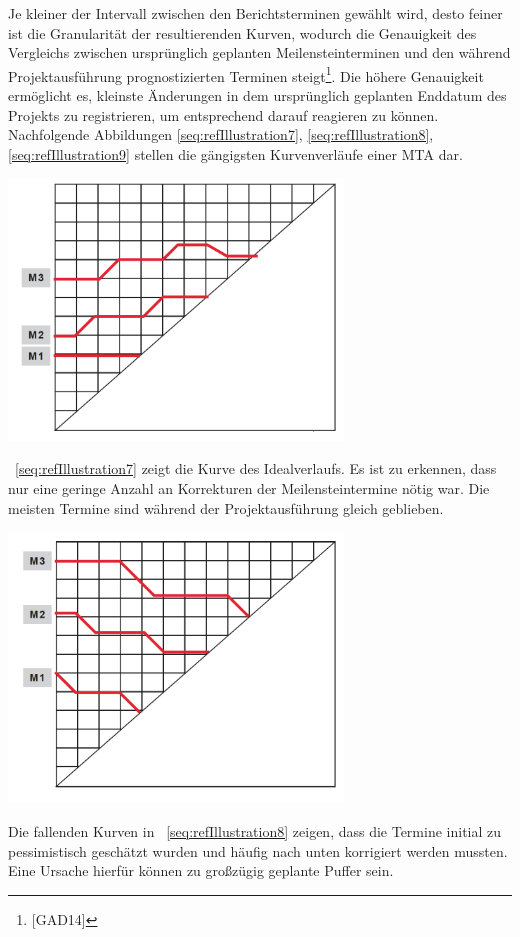 \documentclass[a4paper]{article}
\makeatletter
\newcommand\captionof[1]{\def\@captype{#1}\caption}
\makeatother
\begin{document}
\bigskip

{\sffamily
Je kleiner der Intervall zwischen den Berichtsterminen gewählt wird, desto feiner ist die Granularität der
resultierenden Kurven, wodurch die Genauigkeit des Vergleichs zwischen ursprünglich geplanten Meilensteinterminen und
den während Projektausführung prognostizierten Terminen steigt\footnote{[GAD14]}. Die höhere Genauigkeit ermöglicht es,
kleinste Änderungen in dem ursprünglich geplanten Enddatum des Projekts zu registrieren, um entsprechend darauf
reagieren zu können. Nachfolgende Abbildungen \ref{seq:refIllustration7}, \ref{seq:refIllustration8},
\ref{seq:refIllustration9} stellen die gängigsten Kurvenverläufe einer MTA dar.}


\bigskip

{\centering \includegraphics[width=8.881cm,height=6.944cm]{INMAusarbeitung02-img008.png}
\captionof{figure}[Idealverlauf der MTA{}-Kurven]{Idealverlauf der MTA-Kurven}
\label{seq:refIllustration7}
\par}
{\sffamily
\figurename~\ref{seq:refIllustration7} zeigt die Kurve des Idealverlaufs. Es ist zu erkennen, dass nur eine geringe
Anzahl an Korrekturen der Meilensteintermine nötig war. Die meisten Termine sind während der Projektausführung gleich
geblieben.}

{\centering \includegraphics[width=8.902cm,height=7.177cm]{INMAusarbeitung02-img009.png}
\captionof{figure}[Kurvenverlauf der Pessimistenschätzung]{Kurvenverlauf der Pessimistenschätzung}
\label{seq:refIllustration8}
\par}
{\sffamily
Die fallenden Kurven in \figurename~\ref{seq:refIllustration8} zeigen, dass die Termine initial zu pessimistisch
geschätzt wurden und häufig nach unten korrigiert werden mussten. Eine Ursache hierfür können zu großzügig geplante
Puffer sein.}
\end{document}
